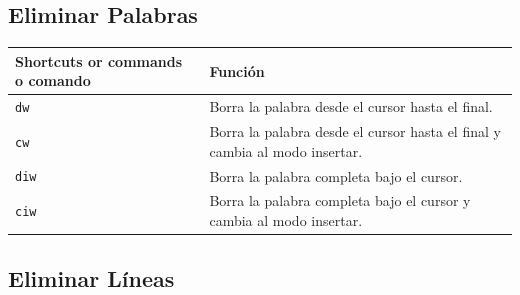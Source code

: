 \documentclass[
  doc,
  floatsintext,
  longtable,
  a4paper,
  nolmodern,
  notxfonts,
  notimes,
  12pt,
  colorlinks=true,linkcolor=blue,citecolor=blue,urlcolor=blue]{apa7}
\newcounter{none} %
\begin{document}
\subsection{Eliminar Palabras}\label{eliminar-palabras}

{\def\LTcaptype{none} %
\begin{longtable}[]{@{}
  >{\raggedright\arraybackslash}p{}
  >{\raggedright\arraybackslash}p{}@{}}
\toprule\noalign{}
\begin{minipage}[b]{\linewidth}\raggedright
Shortcuts or commands o comando
\end{minipage} & \begin{minipage}[b]{\linewidth}\raggedright
Función
\end{minipage} \\
\midrule\noalign{}
\endhead
\bottomrule\noalign{}
\endlastfoot
\texttt{dw} & Borra la palabra desde el cursor hasta el final. \\
\texttt{cw} & Borra la palabra desde el cursor hasta el final y cambia
al modo insertar. \\
\texttt{diw} & Borra la palabra completa bajo el cursor. \\
\texttt{ciw} & Borra la palabra completa bajo el cursor y cambia al modo
insertar. \\
\end{longtable}
}

\subsection{Eliminar Líneas}\label{eliminar-luxedneas}
\end{document}
